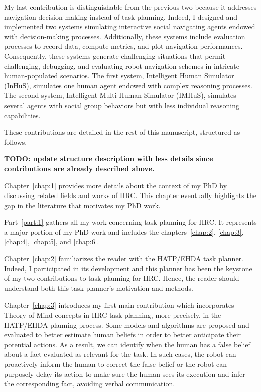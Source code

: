 My last contribution is distinguishable from the previous two because it addresses navigation decision-making instead of task planning. Indeed, I designed and implemented two systems simulating interactive social navigating agents endowed with decision-making processes. Additionally, these systems include evaluation processes to record data, compute metrics, and plot navigation performances. Consequently, these systems generate challenging situations that permit challenging, debugging, and evaluating robot navigation schemes in intricate human-populated scenarios. The first system, Intelligent Human Simulator (InHuS), simulates one human agent endowed with complex reasoning processes. The second system, Intelligent Multi Human Simulator (IMHuS), simulates several agents with social group behaviors but with less individual reasoning capabilities. 

These contributions are detailed in the rest of this manuscript, structured as follows.

\textbf{TODO: update structure description with less details since contributions are already described above.}

Chapter~\ref{chap:1} provides more details about the context of my PhD by discussing related fields and works of HRC. This chapter eventually highlights the gap in the literature that motivates my PhD work.

Part~\ref{part:1} gathers all my work concerning task planning for HRC. It represents a major portion of my PhD work and includes the chapters~\ref{chap:2}, \ref{chap:3}, \ref{chap:4}, \ref{chap:5}, and \ref{chap:6}.

Chapter~\ref{chap:2} familiarizes the reader with the HATP/EHDA task planner. Indeed, I participated in its development and this planner has been the keystone of my two contributions to task-planning for HRC. Hence, the reader should understand both this task planner's motivation and methods.

Chapter~\ref{chap:3} introduces my first main contribution which incorporates Theory of Mind concepts in HRC task-planning, more precisely, in the HATP/EHDA planning process.
Some models and algorithms are proposed and evaluated to better estimate human beliefs in order to better anticipate their potential actions. As a result, we can identify when the human has a false belief about a fact evaluated as relevant for the task. In such cases, the robot can proactively inform the human to correct the false belief or the robot can purposely delay its action to make sure the human sees its execution and infer the corresponding fact, avoiding verbal communication. 

